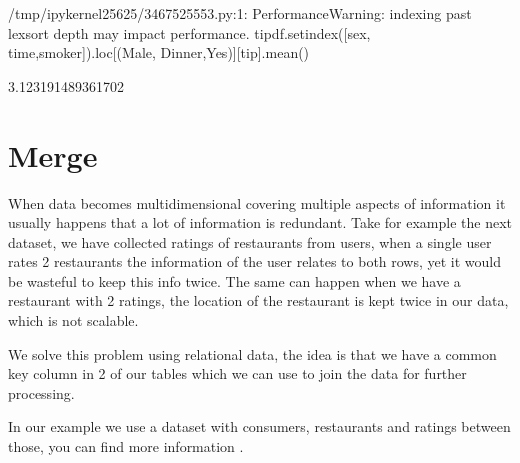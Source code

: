 \documentclass[letterpaper,10pt,english]{jupyterBook}
\begin{document}
\begin{sphinxVerbatim}[commandchars=\\\{\}]
/tmp/ipykernel\PYGZus{}25625/3467525553.py:1: PerformanceWarning: indexing past lexsort depth may impact performance.
  tip\PYGZus{}df.set\PYGZus{}index([\PYGZsq{}sex\PYGZsq{}, \PYGZsq{}time\PYGZsq{},\PYGZsq{}smoker\PYGZsq{}]).loc[(\PYGZsq{}Male\PYGZsq{}, \PYGZsq{}Dinner\PYGZsq{},\PYGZsq{}Yes\PYGZsq{})][\PYGZsq{}tip\PYGZsq{}].mean()
\end{sphinxVerbatim}

\begin{sphinxVerbatim}[commandchars=\\\{\}]
3.123191489361702
\end{sphinxVerbatim}


\chapter{Merge}
\label{\detokenize{c3_data_preprocessing/merge:merge}}\label{\detokenize{c3_data_preprocessing/merge::doc}}
\sphinxAtStartPar
When data becomes multi\sphinxhyphen{}dimensional \sphinxhyphen{} covering multiple aspects of information \sphinxhyphen{} it usually happens that a lot of information is redundant.
Take for example the next dataset, we have collected ratings of restaurants from users, when a single user rates 2 restaurants the information of the user relates to both rows, yet it would be wasteful to keep this info twice.
The same can happen when we have a restaurant with 2 ratings, the location of the restaurant is kept twice in our data, which is not scalable.

\sphinxAtStartPar
We solve this problem using relational data, the idea is that we have a common key column in 2 of our tables which we can use to join the data for further processing.

\sphinxAtStartPar
In our example we use a dataset with consumers, restaurants and ratings between those, you can find more information .

\begin{sphinxVerbatim}[commandchars=\\\{\}]
   
\end{sphinxVerbatim}

\begin{sphinxVerbatim}[commandchars=\\\{\}]
  
\end{sphinxVerbatim}
\end{document}
